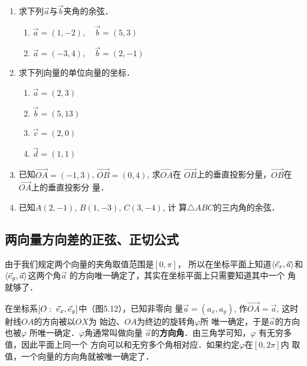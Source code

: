 \begin{ex}
\begin{enumerate}
    \item 求下列$\vec{a}$与$\vec{b}$夹角的余弦．
\begin{enumerate}
    \item $\vec{a}=(1,-2),\quad \vec{b}=(5,3)$
    \item $\vec{a}=(-3,4),\quad \vec{b}=(2,-1)$
\end{enumerate}  
    \item 求下列向量的单位向量的坐标．
\begin{multicols}{2}
\begin{enumerate}
    \item $\vec{a}=(2,3)$
    \item $\vec{b}=(5,13)$
    \item $\vec{c}=(2,0)$
    \item $\vec{d}=(1,1)$
\end{enumerate}
\end{multicols}
    \item 已知$\Vec{OA}=(-1,3)$, 
    $\Vec{OB}=(0,4)$, 求$\Vec{OA}$在
    $\Vec{OB}$上的垂直投影分量，$\Vec{OB}$在$\Vec{OA}$上的垂直投影分
    量．
    \item 已知$A(2,-1)$, $B(1,-3)$, $C(3,-4)$, 计
    算$\triangle ABC$的三内角的余弦．
\end{enumerate} 
\end{ex}

\subsection{两向量方向差的正弦、正切公式}
由于我们规定两个向量的夹角取值范围是$[0,\pi]$，
所以在坐标平面上知道$\left\langle \vec{e}_x,\vec{a} \right\rangle$和$\left\langle \vec{e}_y,\vec{a} \right\rangle$这两个角$\vec{a}$
的方向唯一确定了，其实在坐标平面上只需要知道其中一个
角就够了．

在坐标系$[O:\; \vec{e}_x,\vec{e}_y]$中（图5.12），已知非零向
量$\vec{a}=(a_x,a_y)$, 作$\Vec{OA}=\vec{a}$, 
这时射线$OA$的方向被以$OX$为
始边、$OA$为终边的旋转角$\varphi$所
唯一确定，于是$\vec{a}$的方向也被$\varphi$
所唯一确定．$\varphi$角通常叫做向量
$\vec{a}$的\textbf{方向角}．由三角学可知，$\varphi$
有无穷多值，因此平面上同一个
方向可以和无穷多个角相对应．如果约定$\varphi$在$[0,2\pi]$内
取值，一个向量的方向角就被唯一确定了．

\begin{figure}[htp]
    \centering
    \caption{}
\end{figure}

